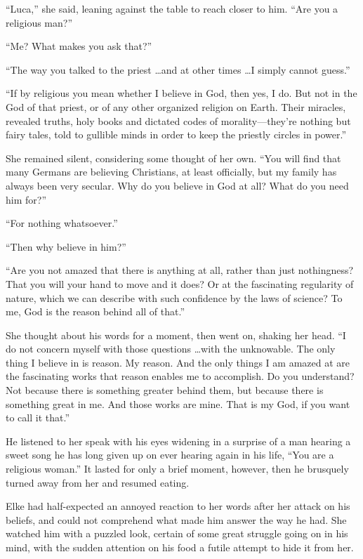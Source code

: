 ``Luca,'' she said, leaning against the table to reach closer to him. ``Are you a religious man?''

``Me? What makes you ask that?''

``The way you talked to the priest \ldots and at other times \ldots I simply cannot guess.''

``If by religious you mean whether I believe in God, then yes, I do. But not in the God of that priest, or of any other organized religion on Earth. Their miracles, revealed truths, holy books and dictated codes of morality---they're nothing but fairy tales, told to gullible minds in order to keep the priestly circles in power.''

She remained silent, considering some thought of her own. ``You will find that many Germans are believing Christians, at least officially, but my family has always been very secular. Why do you believe in God at all? What do you need him for?''

``For nothing whatsoever.''

``Then why believe in him?''

``Are you not amazed that there is anything at all, rather than just nothingness? That you will your hand to move and it does? Or at the fascinating regularity of nature, which we can describe with such confidence by the laws of science? To me, God is the reason behind all of that.''

She thought about his words for a moment, then went on, shaking her head. ``I do not concern myself with those questions \ldots with the unknowable. The only thing I believe in is reason. My reason. And the only things I am amazed at are the fascinating works that reason enables me to accomplish. Do you understand? Not because there is something greater behind them, but because there is something great in me. And those works are mine. That is my God, if you want to call it that.''

He listened to her speak with his eyes widening in a surprise of a man hearing a sweet song he has long given up on ever hearing again in his life, ``You are a religious woman.'' It lasted for only a brief moment, however, then he brusquely turned away from her and resumed eating.

Elke had half-expected an annoyed reaction to her words after her attack on his beliefs, and could not comprehend what made him answer the way he had. She watched him with a puzzled look, certain of some great struggle going on in his mind, with the sudden attention on his food a futile attempt to hide it from her.

